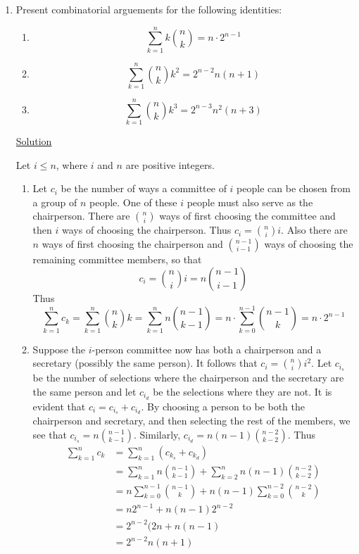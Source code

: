 \begin{enumerate}
\item Present combinatorial arguements for the following identities:

\begin{enumerate}
\item \[\sum_{k=1}^nk\binom{n}{k} = n \cdot 2^{n-1}\]
\item \[\sum_{k=1}^n\binom{n}{k}k^2 = 2^{n-2}n(n + 1)\]
\item \[\sum_{k=1}^n\binom{n}{k}k^3 = 2^{n-3}n^2(n + 3)\]
\end{enumerate}

\underline{Solution}

Let $i \le n$, where $i$ and $n$ are positive integers.

\begin{enumerate}
\item Let $c_i$ be the number of ways a committee of $i$ people can be chosen
from a group of $n$ people. One of these $i$ people must also serve as the
chairperson. There are $\binom{n}{i}$ ways of first choosing the committee and
then $i$ ways of choosing the chairperson. Thus $c_i = \binom{n}{i}i$. Also
there are $n$ ways of first choosing the chairperson and $\binom{n-1}{i-1}$ ways
of choosing the remaining committee members, so that
\[c_i = \binom{n}{i}i = n\binom{n-1}{i-1}\]
Thus
\[\sum_{k=1}^nc_k = \sum_{k=1}^n\binom{n}{k}k = \sum_{k=1}^nn\binom{n-1}{k-1} = 
n \cdot \sum_{k=0}^{n-1}\binom{n-1}{k} = n \cdot 2^{n-1}\]

\item Suppose the $i$-person committee now has both a chairperson and a 
secretary (possibly the same person). It follows that $c_i = \binom{n}{i}i^2$. 
Let $c_{i_s}$ be the number of selections where the chairperson and the
secretary are the same person and let $c_{i_d}$ be the selections where they
are not. It is evident that $c_i = c_{i_s} + c_{i_d}$. By choosing a person to
be both the chairperson and secretary, and then selecting the rest of the
members, we see that $c_{i_s} = n\binom{n-1}{k-1}$. Similarly, 
$c_{i_d} = n(n-1)\binom{n-2}{k-2}$. Thus
\begin{align*}
\sum_{k=1}^nc_k &= \sum_{k=1}^n(c_{k_s} + c_{k_d}) \\ 
&= \sum_{k=1}^nn\binom{n-1}{k-1} + \sum_{k=2}^nn(n-1)\binom{n-2}{k-2} \\
&= n\sum_{k=0}^{n-1}\binom{n-1}{k} + n(n-1)\sum_{k=0}^{n-2}\binom{n-2}{k} \\
&= n2^{n-1} + n(n-1)2^{n-2} \\
&= 2^{n-2}(2n + n(n - 1) \\
&= 2^{n-2}n(n+1)
\end{align*}


\end{enumerate}
\end{enumerate}

